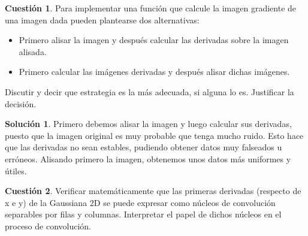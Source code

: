 \documentclass[a4paper, 11pt]{article}
\theoremstyle{definition}
\newtheorem{cuestion}{Cuestión}
\newtheorem*{solucion}{Solución}
\begin{document}
  \begin{cuestion}
      Para implementar una función que calcule la imagen gradiente de una
      imagen dada pueden plantearse dos alternativas:
      \begin{itemize}
      	\item Primero alisar la imagen y después calcular las derivadas sobre la imagen alisada.
      	\item Primero calcular las imágenes derivadas y después alisar dichas imágenes.
      \end{itemize}
      Discutir y decir que estrategia es la más adecuada, si alguna lo es. Justificar la decisión.

  \end{cuestion}

  \begin{solucion}
      Primero debemos alisar la imagen y luego calcular sus derivadas, puesto que la imagen
      original es muy probable que tenga mucho ruido. Esto hace que las derivadas no
      sean estables, pudiendo obtener datos muy falseados u erróneos. Alisando primero la
      imagen, obtenemos unos datos más uniformes y útiles.
  \end{solucion}

  \begin{cuestion}
  	Verificar matemáticamente que las primeras derivadas (respecto de x
  	e y) de la Gaussiana 2D se puede expresar como núcleos de convolución
  	separables por filas y columnas. Interpretar el papel de dichos núcleos
  	en el proceso de convolución.
  \end{cuestion}
\end{document}
